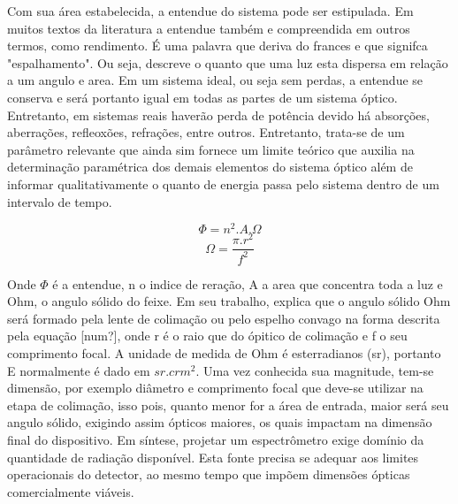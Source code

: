 \documentclass[oneside,openright,12pt]{ufsm_2021} %
\begin{document}
        \par Com sua área estabelecida, a entendue \cite{EquacaoEntendue} do sistema pode ser estipulada. Em muitos textos da literatura a entendue também e compreendida em outros termos, como rendimento. É uma palavra que deriva do frances e que signifca "espalhamento". Ou seja, descreve o quanto que uma luz esta dispersa em relação a um angulo e area. Em um sistema ideal, ou seja sem perdas, a entendue se conserva e será portanto igual em todas as partes de um sistema óptico. Entretanto, em sistemas reais haverão perda de potência devido há absorções, aberrações, refleoxões, refrações, entre outros. Entretanto, trata-se de um parâmetro relevante que ainda sim fornece um limite teórico que auxilia na determinação paramétrica dos demais elementos do sistema óptico além de informar qualitativamente o quanto de energia passa pelo sistema dentro de um intervalo de tempo.

        \begin{equation}
        \label{eq:Entendue}
            \Phi = n^2.A.\Omega
        \end{equation}
        \begin{equation}
        \label{eq:AnguloSolido}
            \Omega = \frac{\pi.r^2}{f^2}
        \end{equation}

        \par Onde $\Phi$ é a entendue, n o indice de reração, A a area que concentra toda a luz e Ohm, o angulo sólido do feixe. Em seu trabalho, \cite{LivroFT} explica que o angulo sólido Ohm será formado pela lente de colimação ou pelo espelho convago na forma descrita pela equação [num?], onde r é o raio que do ópitico de colimação e f o seu comprimento focal. A unidade de medida de Ohm é esterradianos (sr), portanto E normalmente é dado em $sr.crm^2$. Uma vez conhecida sua magnitude, tem-se dimensão, por exemplo diâmetro e comprimento focal que deve-se utilizar na etapa de colimação, isso pois, quanto menor for a área de entrada, maior será seu angulo sólido, exigindo assim ópticos maiores, os quais impactam na dimensão final do dispositivo. Em síntese, projetar um espectrômetro exige domínio \cite{artigo1} da quantidade de radiação disponível. Esta fonte precisa se adequar aos limites operacionais do detector, ao mesmo tempo que impõem dimensões ópticas comercialmente viáveis.
\end{document}
